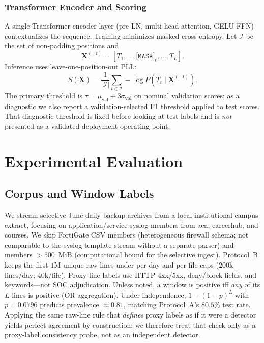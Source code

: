\documentclass[a4paper]{llncs}
\begin{document}
\subsubsection{Transformer Encoder and Scoring}
A single Transformer encoder layer (pre-LN, multi-head attention, GELU FFN) contextualizes the sequence. Training minimizes masked cross-entropy. Let $\mathcal{I}$ be the set of non-padding positions and
\begin{equation}
    \mathbf{X}^{(-t)}=[T_1,\ldots,\texttt{[MASK]}_t,\ldots,T_L].
\end{equation}
Inference uses leave-one-position-out PLL:
\begin{equation}
    S(\mathbf{X}) = \frac{1}{|\mathcal{I}|} \sum_{t\in\mathcal{I}} -\log P(T_t \mid \mathbf{X}^{(-t)}).
\end{equation}
The primary threshold is $\tau=\mu_{\mathrm{val}}+3\sigma_{\mathrm{val}}$ on nominal validation scores; as a diagnostic we also report a validation-selected F1 threshold applied to test scores. That diagnostic threshold is fixed before looking at test labels and is \emph{not} presented as a validated deployment operating point.

\section{Experimental Evaluation}
\subsection{Corpus and Window Labels}
We stream selective June daily backup archives from a local institutional campus extract, focusing on application/service syslog members from aca, careerhub, and courses. We skip FortiGate CSV members (heterogeneous firewall schema; not comparable to the syslog template stream without a separate parser) and members ${>}500$~MiB (computational bound for the selective ingest). Protocol~B keeps the first $1$M unique raw lines under per-day and per-file caps ($200$k lines/day; $40$k/file). Proxy line labels use HTTP $4$xx/$5$xx, deny/block fields, and keywords---not SOC adjudication. Unless noted, a window is positive iff \emph{any} of its $L$ lines is positive (OR aggregation). Under independence, $1-(1-p)^{L}$ with $p{=}0.0796$ predicts prevalence $\approx0.81$, matching Protocol~A's $80.5\%$ test rate. Applying the same raw-line rule that \emph{defines} proxy labels as if it were a detector yields perfect agreement by construction; we therefore treat that check only as a proxy-label consistency probe, not as an independent detector.
\end{document}
